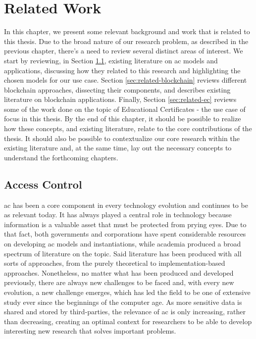 \chapter{Related Work}
\label{chap:related}

In this chapter, we present some relevant background and work that is related to this thesis. Due to the broad nature of our research problem, as described in the previous chapter, there's a need to review several distinct areas of interest. We start by reviewing, in Section \ref{sec:related-ac}, existing literature on \gls{ac} models and applications, discussing how they related to this research and highlighting the chosen models for our use case. Section \ref{sec:related-blockchain} reviews different blockchain approaches, dissecting their components, and describes existing literature on blockchain applications. Finally, Section \ref{sec:related-ec} reviews some of the work done on the topic of Educational Certificates - the use case of focus in this thesis. By the end of this chapter, it should be possible to realize how these concepts, and existing literature, relate to the core contributions of the thesis. It should also be possible to contextualize our core research within the existing literature and, at the same time, lay out the necessary concepts to understand the forthcoming chapters.

\section{Access Control}
\label{sec:related-ac}

\glsdesc{ac} has been a core component in every technology evolution and continues to be as relevant today. It has always played a central role in technology because information is a valuable asset that must be protected from prying eyes. Due to that fact, both governments and corporations have spent considerable resources on developing \gls{ac} models and instantiations, while academia produced a broad spectrum of literature on the topic. Said literature has been produced with all sorts of approaches, from the purely theoretical to implementation-based approaches. Nonetheless, no matter what has been produced and developed previously, there are always new challenges to be faced and, with every new evolution, a new challenge emerges, which has led the field to be one of extensive study ever since the beginnings of the computer age. As more sensitive data is shared and stored by third-parties, the relevance of \gls{ac} is only increasing, rather than decreasing, creating an optimal context for researchers to be able to develop interesting new research that solves important problems.

